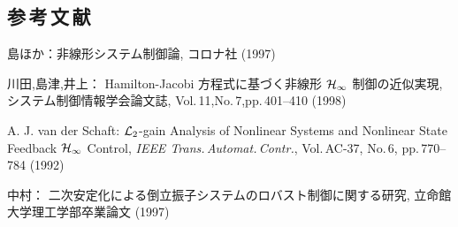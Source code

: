 
\begin{center}
  \section*{参\,考\,文\,献}                      %
\end{center}

\begin{thebibliography}{99}
  \label{cite:Shima1}
  島ほか：非線形システム制御論,
  コロナ社 (1997)
  
  \label{cite:Kawata1}
  川田,島津,井上：
  Hamilton-Jacobi 方程式に基づく非線形 \({\cal H}_{\infty}\) 制御の近似実現,
  システム制御情報学会論文誌,
  Vol.\,11,No.\,7,pp.\,401--410 (1998)
  
  \label{cite:Schaft1}
  A. J. van der Schaft: 
  \({\cal L}_{\rm 2}\)-gain Analysis of Nonlinear Systems and 
  Nonlinear State Feedback \({\cal H}_{\infty}\) Control, 
  {\it IEEE Trans.\,Automat.\,Contr.}, 
  Vol.\,AC-37, No.\,6, pp.\,770--784 (1992)
  
  \label{cite:Nakamura1}
  中村：
  二次安定化による倒立振子システムのロバスト制御に関する研究,
  立命館大学理工学部卒業論文 (1997)
  
\end{thebibliography}
